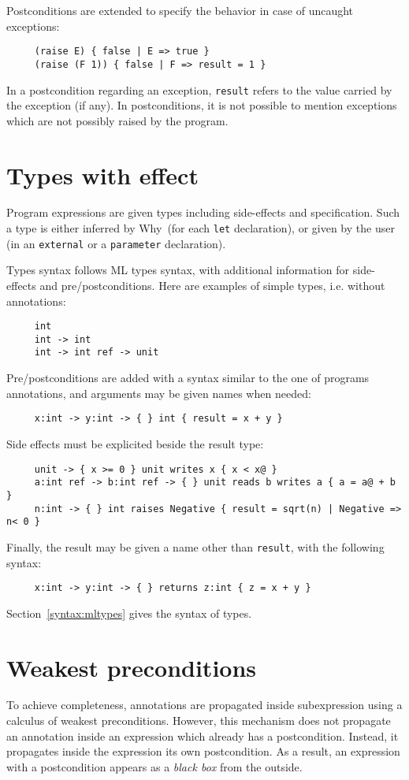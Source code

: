 \documentclass[a4paper,12pt]{report}
\makeatletter
\newcommand{\why}{\textsf{Why}}
\newcommand{\indextt}[1]{\index{#1@\texttt{#1}}}
\makeatother
\begin{document}
Postconditions are extended to specify the behavior in case of
uncaught exceptions:
\begin{verbatim}
     (raise E) { false | E => true }
     (raise (F 1)) { false | F => result = 1 }
\end{verbatim}
In a postcondition regarding an exception, \texttt{result} refers to
the value carried by the exception (if any).
In postconditions, it is not possible to mention exceptions which
are not possibly raised by the program.


\section{Types with effect}
\label{types}

Program expressions are given types including side-effects and
specification. Such a type is either inferred by \why\ (for each
\texttt{let} declaration), or given by the user (in an
\texttt{external} or a \texttt{parameter} declaration).

Types syntax follows ML types syntax, with additional information for
side-effects and pre/postconditions. Here are examples of simple types,
i.e. without annotations:
\begin{verbatim}
     int
     int -> int
     int -> int ref -> unit
\end{verbatim}
Pre/postconditions are added with a syntax similar to the one of
programs annotations, and arguments may be given names when needed:
\begin{verbatim}
     x:int -> y:int -> { } int { result = x + y }
\end{verbatim}
Side effects must be explicited beside the result type:
\indextt{reads}\indextt{writes}\indextt{raises}%
\begin{verbatim}
     unit -> { x >= 0 } unit writes x { x < x@ }
     a:int ref -> b:int ref -> { } unit reads b writes a { a = a@ + b }
     n:int -> { } int raises Negative { result = sqrt(n) | Negative => n< 0 }
\end{verbatim}
Finally, the result may be given a name other than \texttt{result},
with the following syntax:
\begin{verbatim}
     x:int -> y:int -> { } returns z:int { z = x + y }
\end{verbatim}
Section~\ref{syntax:mltypes} gives the syntax of types.


\section{Weakest preconditions}
\label{wp}
To achieve completeness, annotations are propagated inside
subexpression using a calculus of weakest preconditions.
However, this mechanism does not propagate an annotation inside an
expression which already has a postcondition. Instead, it propagates
inside the expression its own postcondition. As a result, an
expression with a postcondition appears as a \emph{black box} from the
outside. 
\end{document}
